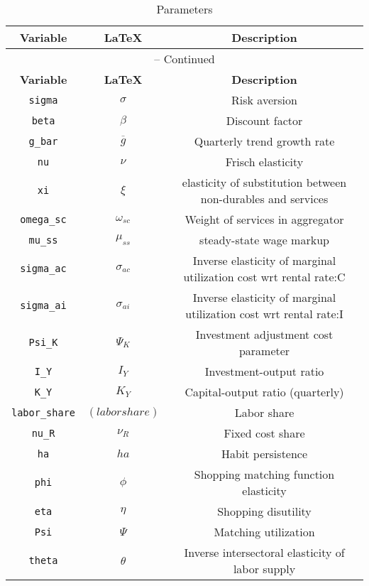 \begin{center}
\begin{longtable}{ccc}
\caption{Parameters}\\%
\hline%
\multicolumn{1}{c}{\textbf{Variable}} &
\multicolumn{1}{c}{\textbf{\LaTeX}} &
\multicolumn{1}{c}{\textbf{Description}}\\%
\hline\hline%
\endfirsthead
\multicolumn{3}{c}{{\tablename} \thetable{} -- Continued}\\%
\hline%
\multicolumn{1}{c}{\textbf{Variable}} &
\multicolumn{1}{c}{\textbf{\LaTeX}} &
\multicolumn{1}{c}{\textbf{Description}}\\%
\hline\hline%
\endhead
\texttt{sigma} & ${\sigma}$ & Risk aversion\\
\texttt{beta} & ${\beta}$ & Discount factor\\
\texttt{g\_bar} & ${\overline{g}}$ & Quarterly trend growth rate\\
\texttt{nu} & $\nu$ & Frisch elasticity\\
\texttt{xi} & $\xi$ & elasticity of substitution between non-durables and services\\
\texttt{omega\_sc} & $\omega_{sc}$ & Weight of services in aggregator\\
\texttt{mu\_ss} & $\mu_{ss}$ & steady-state wage markup\\
\texttt{sigma\_ac} & ${\sigma_{ac}}$ & Inverse elasticity of marginal utilization cost wrt rental rate:C\\
\texttt{sigma\_ai} & ${\sigma_{ai}}$ & Inverse elasticity of marginal utilization cost wrt rental rate:I\\
\texttt{Psi\_K} & ${\Psi_{K}}$ & Investment adjustment cost parameter\\
\texttt{I\_Y} & ${I_Y}$ & Investment-output ratio\\
\texttt{K\_Y} & ${K_Y}$ & Capital-output ratio (quarterly)\\
\texttt{labor\_share} & $(labor share)$ & Labor share\\
\texttt{nu\_R} & ${\nu_R}$ & Fixed cost share\\
\texttt{ha} & ${ha}$ & Habit persistence\\
\texttt{phi} & ${\phi}$ & Shopping matching function elasticity\\
\texttt{eta} & ${\eta}$ & Shopping disutility\\
\texttt{Psi} & ${\Psi}$ & Matching utilization\\
\texttt{theta} & ${\theta}$ & Inverse intersectoral elasticity of labor supply\\

\end{longtable}
\end{center}
